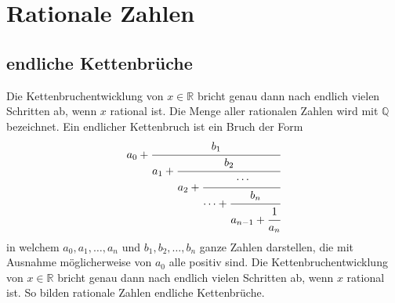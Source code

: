 
%
%
%
\section{Rationale Zahlen
\label{kettenbruch:section:Zahlen}}
\subsection{endliche Kettenbrüche}
Die Kettenbruchentwicklung von $x \in \mathbb{R}$ bricht genau dann nach endlich
vielen Schritten ab, wenn $x$ rational ist.
Die Menge aller rationalen Zahlen wird mit $\mathbb{Q}$ bezeichnet.
Ein endlicher Kettenbruch ist ein Bruch der Form
\begin{equation}
a_0 + \cfrac{b_1}{a_1+\cfrac{b_2}{a_2+\cfrac{\cdots}{\cdots+\cfrac{b_n}{a_{n-1} + \cfrac{1}{a_n}}}}}
\end{equation}
in welchem $a_0, a_1,\dots,a_n$ und $b_1,b_2,\dots,b_n$ ganze Zahlen
darstellen, die mit Ausnahme möglicherweise von $a_0$ alle positiv sind.
Die Kettenbruchentwicklung von $x \in \mathbb{R}$ bricht genau dann
nach endlich vielen Schritten ab, wenn $x$ rational ist. So bilden
rationale Zahlen endliche Kettenbrüche.

